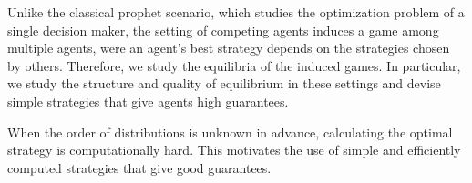 Unlike the classical prophet scenario, which studies the optimization problem of a single decision maker, the setting of competing agents induces a game among multiple agents, were an agent's best strategy depends on the strategies chosen by others. Therefore, we study the equilibria of the induced games. In particular, we study the structure and quality of equilibrium in these settings and devise simple strategies that give agents high guarantees.

When the order of distributions is unknown in advance, calculating the optimal strategy is computationally hard. This motivates the use of simple and efficiently computed strategies that give good guarantees. 

